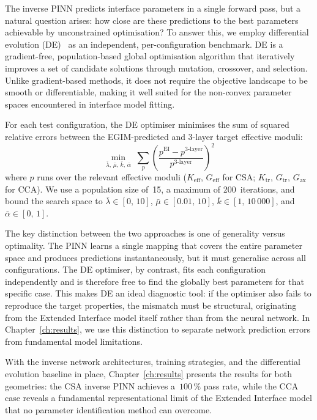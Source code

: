 \documentclass[oneside, 12pt, a4paper, bibliography=totoc]{book}
\begin{document}
The inverse PINN predicts interface parameters in a single forward pass, but a natural question arises: how close are these predictions to the best parameters achievable by unconstrained optimisation? To answer this, we employ differential evolution (DE)~\cite{StornPrice1997} as an independent, per-configuration benchmark. DE is a gradient-free, population-based global optimisation algorithm that iteratively improves a set of candidate solutions through mutation, crossover, and selection. Unlike gradient-based methods, it does not require the objective landscape to be smooth or differentiable, making it well suited for the non-convex parameter spaces encountered in interface model fitting.

For each test configuration, the DE optimiser minimises the sum of squared relative errors between the EGIM-predicted and 3-layer target effective moduli:
%
\begin{equation}
    \min_{\bar{\lambda},\, \bar{\mu},\, \bar{k},\, \bar{\alpha}} \;
    \sum_{p} \left( \frac{p^{\text{EI}} - p^{\text{3-layer}}}{p^{\text{3-layer}}} \right)^{\!2}
    \label{eq:de_objective}
\end{equation}
%
where $p$ runs over the relevant effective moduli ($K_{\text{eff}}$, $G_{\text{eff}}$ for CSA; $K_{\text{tr}}$, $G_{\text{tr}}$, $G_{\text{ax}}$ for CCA). We use a population size of~15, a maximum of 200~iterations, and bound the search space to $\bar{\lambda} \in [0,\, 10]$, $\bar{\mu} \in [0.01,\, 10]$, $\bar{k} \in [1,\, 10\,000]$, and $\bar{\alpha} \in [0,\, 1]$.

The key distinction between the two approaches is one of generality versus optimality. The PINN learns a single mapping that covers the entire parameter space and produces predictions instantaneously, but it must generalise across all configurations. The DE optimiser, by contrast, fits each configuration independently and is therefore free to find the globally best parameters for that specific case. This makes DE an ideal diagnostic tool: if the optimiser also fails to reproduce the target properties, the mismatch must be structural, originating from the Extended Interface model itself rather than from the neural network. In Chapter~\ref{ch:results}, we use this distinction to separate network prediction errors from fundamental model limitations.

With the inverse network architectures, training strategies, and the differential evolution baseline in place, Chapter~\ref{ch:results} presents the results for both geometries: the CSA inverse PINN achieves a~$100\,\%$ pass rate, while the CCA case reveals a fundamental representational limit of the Extended Interface model that no parameter identification method can overcome.
\end{document}
